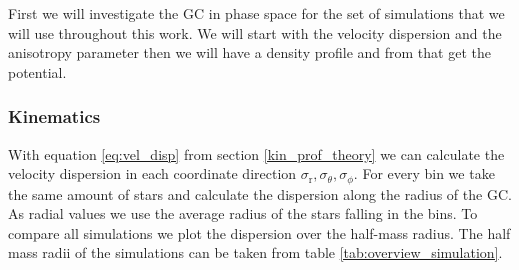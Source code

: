 First we will investigate the \ac{GC} in phase space for the set of simulations that we will use throughout this work. We will start with the velocity dispersion and the anisotropy parameter then we will have a density profile and from that get the potential. 

\subsubsection{Kinematics}
With equation \eqref{eq:vel_disp} from section \ref{kin_prof_theory} we can calculate the velocity dispersion in each coordinate direction \(\sigma_\mathrm{r},\sigma_\theta,\sigma_\phi\). For every bin we take the same amount of stars and calculate the dispersion along the radius of the \ac{GC}. As radial values we use the average radius of the stars falling in the bins. To compare all simulations we plot the dispersion over the half-mass radius. The half mass radii of the simulations can be taken from table \ref{tab:overview_simulation}. 

